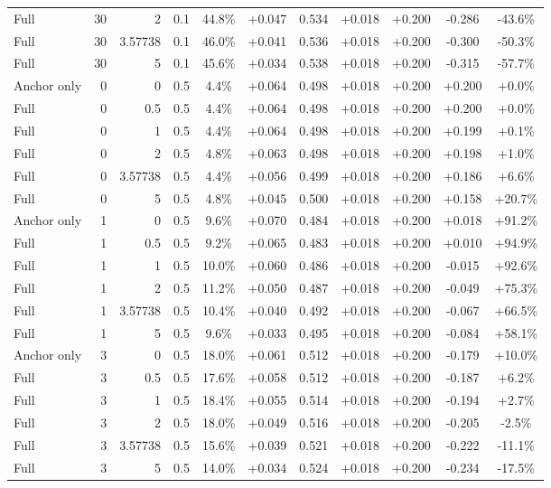 \begin{table}[htbp]
\begin{tabular}{lrrrccccccc}
Full & 30 & 2 & 0.1 & 44.8\% & +0.047 & 0.534 & +0.018 & +0.200 & -0.286 & -43.6\% \\
Full & 30 & 3.57738 & 0.1 & 46.0\% & +0.041 & 0.536 & +0.018 & +0.200 & -0.300 & -50.3\% \\
Full & 30 & 5 & 0.1 & 45.6\% & +0.034 & 0.538 & +0.018 & +0.200 & -0.315 & -57.7\% \\
Anchor only & 0 & 0 & 0.5 & 4.4\% & +0.064 & 0.498 & +0.018 & +0.200 & +0.200 & +0.0\% \\
Full & 0 & 0.5 & 0.5 & 4.4\% & +0.064 & 0.498 & +0.018 & +0.200 & +0.200 & +0.0\% \\
Full & 0 & 1 & 0.5 & 4.4\% & +0.064 & 0.498 & +0.018 & +0.200 & +0.199 & +0.1\% \\
Full & 0 & 2 & 0.5 & 4.8\% & +0.063 & 0.498 & +0.018 & +0.200 & +0.198 & +1.0\% \\
Full & 0 & 3.57738 & 0.5 & 4.4\% & +0.056 & 0.499 & +0.018 & +0.200 & +0.186 & +6.6\% \\
Full & 0 & 5 & 0.5 & 4.8\% & +0.045 & 0.500 & +0.018 & +0.200 & +0.158 & +20.7\% \\
Anchor only & 1 & 0 & 0.5 & 9.6\% & +0.070 & 0.484 & +0.018 & +0.200 & +0.018 & +91.2\% \\
Full & 1 & 0.5 & 0.5 & 9.2\% & +0.065 & 0.483 & +0.018 & +0.200 & +0.010 & +94.9\% \\
Full & 1 & 1 & 0.5 & 10.0\% & +0.060 & 0.486 & +0.018 & +0.200 & -0.015 & +92.6\% \\
Full & 1 & 2 & 0.5 & 11.2\% & +0.050 & 0.487 & +0.018 & +0.200 & -0.049 & +75.3\% \\
Full & 1 & 3.57738 & 0.5 & 10.4\% & +0.040 & 0.492 & +0.018 & +0.200 & -0.067 & +66.5\% \\
Full & 1 & 5 & 0.5 & 9.6\% & +0.033 & 0.495 & +0.018 & +0.200 & -0.084 & +58.1\% \\
Anchor only & 3 & 0 & 0.5 & 18.0\% & +0.061 & 0.512 & +0.018 & +0.200 & -0.179 & +10.0\% \\
Full & 3 & 0.5 & 0.5 & 17.6\% & +0.058 & 0.512 & +0.018 & +0.200 & -0.187 & +6.2\% \\
Full & 3 & 1 & 0.5 & 18.4\% & +0.055 & 0.514 & +0.018 & +0.200 & -0.194 & +2.7\% \\
Full & 3 & 2 & 0.5 & 18.0\% & +0.049 & 0.516 & +0.018 & +0.200 & -0.205 & -2.5\% \\
Full & 3 & 3.57738 & 0.5 & 15.6\% & +0.039 & 0.521 & +0.018 & +0.200 & -0.222 & -11.1\% \\
Full & 3 & 5 & 0.5 & 14.0\% & +0.034 & 0.524 & +0.018 & +0.200 & -0.234 & -17.5\% \\

\end{tabular}
\end{table}
